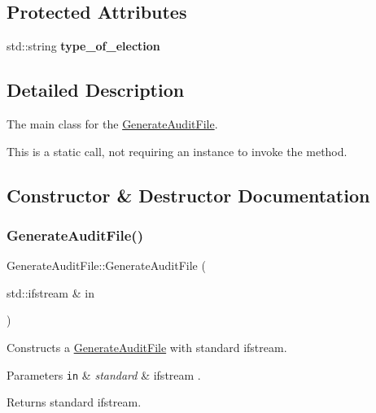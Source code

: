 \subsection*{Protected Attributes}
\begin{DoxyCompactItemize}
\item 
\mbox{\label{classGenerateAuditFile_adf088621af9c22fdaa604a38e6508f9a}} 
std\+::string {\bfseries type\+\_\+of\+\_\+election}
\end{DoxyCompactItemize}


\subsection{Detailed Description}
The main class for the \hyperlink{classGenerateAuditFile}{Generate\+Audit\+File}. 

This is a static call, not requiring an instance to invoke the method. 

\subsection{Constructor \& Destructor Documentation}
\mbox{\label{classGenerateAuditFile_ac3aed11997b1dd1ca73642b40dfc8d70}} 
\subsubsection{\texorpdfstring{Generate\+Audit\+File()}{GenerateAuditFile()}}
{\footnotesize\ttfamily Generate\+Audit\+File\+::\+Generate\+Audit\+File (\begin{DoxyParamCaption}\item[{std\+::ifstream \&}]{in }\end{DoxyParamCaption})}



Constructs a \hyperlink{classGenerateAuditFile}{Generate\+Audit\+File} with standard ifstream. 


\begin{DoxyParams}[1]{Parameters}
\mbox{\tt in}  & {\em standard} & ifstream .\\
\hline
\end{DoxyParams}
\begin{DoxyReturn}{Returns}
standard ifstream. 
\end{DoxyReturn}


